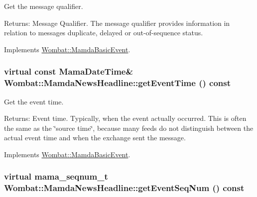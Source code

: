 Get the message qualifier. 

\begin{Desc}
\item[Returns:]Message Qualifier. The message qualifier provides information in relation to messages duplicate, delayed or out-of-sequence status. \end{Desc}


Implements \hyperlink{classWombat_1_1MamdaBasicEvent_675ce8f1de581548426335423d6b3864}{Wombat::Mamda\-Basic\-Event}.\hypertarget{classWombat_1_1MamdaNewsHeadline_c5172910dd6b87284540452e7267b14e}{
\subsubsection[getEventTime]{\setlength{\rightskip}{0pt plus 5cm}virtual const Mama\-Date\-Time\& Wombat::Mamda\-News\-Headline::get\-Event\-Time () const}}
\label{classWombat_1_1MamdaNewsHeadline_c5172910dd6b87284540452e7267b14e}


Get the event time. 

\begin{Desc}
\item[Returns:]Event time. Typically, when the event actually occurred. This is often the same as the \char`\"{}source time\char`\"{}, because many feeds do not distinguish between the actual event time and when the exchange sent the message. \end{Desc}


Implements \hyperlink{classWombat_1_1MamdaBasicEvent_7285491c2c657207a64b1b0449c0339b}{Wombat::Mamda\-Basic\-Event}.\hypertarget{classWombat_1_1MamdaNewsHeadline_f89a01f21fc32da059c7ab954f5d15c6}{
\subsubsection[getEventSeqNum]{\setlength{\rightskip}{0pt plus 5cm}virtual mama\_\-seqnum\_\-t Wombat::Mamda\-News\-Headline::get\-Event\-Seq\-Num () const}}
\label{classWombat_1_1MamdaNewsHeadline_f89a01f21fc32da059c7ab954f5d15c6}



